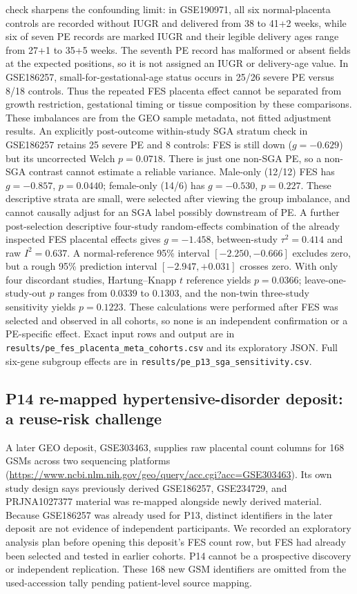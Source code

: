 \documentclass[11pt,a4paper]{article}
\begin{document}
check sharpens the confounding limit: in GSE190971, all six normal-placenta controls are recorded without IUGR and delivered from 38 to 41+2 weeks, while six of seven PE records are marked IUGR and their legible delivery ages range from 27+1 to 35+5 weeks. The seventh PE record has malformed or absent fields at the expected positions, so it is not assigned an IUGR or delivery-age value. In GSE186257, small-for-gestational-age status occurs in 25/26 severe PE versus 8/18 controls. Thus the repeated FES placenta effect cannot be separated from growth restriction, gestational timing or tissue composition by these comparisons. These imbalances are from the GEO sample metadata, not fitted adjustment results. An explicitly post-outcome within-study SGA stratum check in GSE186257 retains 25 severe PE and 8 controls: FES is still down ($g=-0.629$) but its uncorrected Welch $p=0.0718$. There is just one non-SGA PE, so a non-SGA contrast cannot estimate a reliable variance. Male-only (12/12) FES has $g=-0.857$, $p=0.0440$; female-only (14/6) has $g=-0.530$, $p=0.227$. These descriptive strata are small, were selected after viewing the group imbalance, and cannot causally adjust for an SGA label possibly downstream of PE. A further post-selection descriptive four-study random-effects combination of the already inspected FES placental effects gives $g=-1.458$, between-study $\tau^2=0.414$ and raw $I^2=0.637$. A normal-reference 95\% interval $[-2.250,-0.666]$ excludes zero, but a rough 95\% prediction interval $[-2.947,+0.031]$ crosses zero. With only four discordant studies, Hartung--Knapp $t$ reference yields $p=0.0366$; leave-one-study-out $p$ ranges from $0.0339$ to $0.1303$, and the non-twin three-study sensitivity yields $p=0.1223$. These calculations were performed after FES was selected and observed in all cohorts, so none is an independent confirmation or a PE-specific effect. Exact input rows and output are in \texttt{results/pe\_fes\_placenta\_meta\_cohorts.csv} and its exploratory JSON. Full six-gene subgroup effects are in \texttt{results/pe\_p13\_sga\_sensitivity.csv}.

\subsection{P14 re-mapped hypertensive-disorder deposit: a reuse-risk challenge}
A later GEO deposit, GSE303463, supplies raw placental count columns for 168 GSMs across two sequencing platforms (\url{https://www.ncbi.nlm.nih.gov/geo/query/acc.cgi?acc=GSE303463}). Its own study design says previously derived GSE186257, GSE234729, and PRJNA1027377 material was re-mapped alongside newly derived material. Because GSE186257 was already used for P13, distinct identifiers in the later deposit are not evidence of independent participants. We recorded an exploratory analysis plan before opening this deposit's FES count row, but FES had already been selected and tested in earlier cohorts. P14 cannot be a prospective discovery or independent replication. These 168 new GSM identifiers are omitted from the used-accession tally pending patient-level source mapping.
\end{document}

